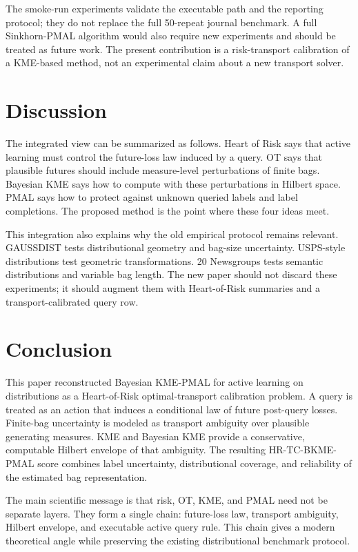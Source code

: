\documentclass[10pt,journal]{IEEEtran}
\begin{document}
The smoke-run experiments validate the executable path and the reporting protocol; they do not replace the full 50-repeat journal benchmark. A full Sinkhorn-PMAL algorithm would also require new experiments and should be treated as future work. The present contribution is a risk-transport calibration of a KME-based method, not an experimental claim about a new transport solver.

\section{Discussion}
\label{sec:discussion}

The integrated view can be summarized as follows. Heart of Risk says that active learning must control the future-loss law induced by a query. OT says that plausible futures should include measure-level perturbations of finite bags. Bayesian KME says how to compute with these perturbations in Hilbert space. PMAL says how to protect against unknown queried labels and label completions. The proposed method is the point where these four ideas meet.

This integration also explains why the old empirical protocol remains relevant. GAUSSDIST tests distributional geometry and bag-size uncertainty. USPS-style distributions test geometric transformations. 20 Newsgroups tests semantic distributions and variable bag length. The new paper should not discard these experiments; it should augment them with Heart-of-Risk summaries and a transport-calibrated query row.

\section{Conclusion}
\label{sec:conclusion}

This paper reconstructed Bayesian KME-PMAL for active learning on distributions as a Heart-of-Risk optimal-transport calibration problem. A query is treated as an action that induces a conditional law of future post-query losses. Finite-bag uncertainty is modeled as transport ambiguity over plausible generating measures. KME and Bayesian KME provide a conservative, computable Hilbert envelope of that ambiguity. The resulting HR-TC-BKME-PMAL score combines label uncertainty, distributional coverage, and reliability of the estimated bag representation.

The main scientific message is that risk, OT, KME, and PMAL need not be separate layers. They form a single chain: future-loss law, transport ambiguity, Hilbert envelope, and executable active query rule. This chain gives a modern theoretical angle while preserving the existing distributional benchmark protocol.
\end{document}
